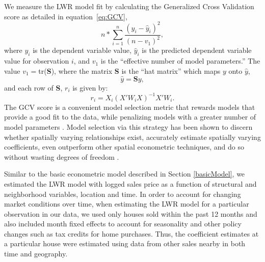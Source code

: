 \documentclass{article}\usepackage[]{graphicx}\usepackage[]{color}
\begin{document}
We measure the LWR model fit by calculating the Generalized Cross Validation score as detailed in equation~\eqref{eq:GCV},
\begin{equation}\label{eq:GCV}
n*\sum_{i=1}^{n}\frac{(y_i-\hat{y}_i)^2}{(n-v_1)^2}, 
\end{equation} 
where $y_i$ is the dependent variable value, $\hat{y}_i$ is the predicted dependent variable value for observation $i$, and $v_1$ is the ``effective number of model parameters.'' The value  
$v_1=$tr(\textbf{S}), where the matrix \textbf{S} is the ``hat matrix'' which maps $y$ onto $\hat{y}$,
                   \begin{equation*}
                   \hat{y}=\textbf{S}y,
                   \end{equation*}
                   and each row of \textbf{S}, $r_i$ is given by:
                     \begin{equation*}
                   r_i=X_i(X'W_iX)^{-1}X'W_i.
                   \end{equation*}
The GCV score is a convenient model selection metric that rewards models that provide a good fit to the data, while penalizing models with a greater number of model parameters \citep{Loader1999, McMillen2010}. Model selection via this strategy has been shown to discern whether spatially varying relationships exist, accurately estimate spatially varying coefficients, even outperform other spatial econometric techniques, and do so without wasting degrees of freedom \citep{Paez2011, McMillen2010, McMillen2012}. 

Similar to the basic econometric model described in Section \ref{basicModel}, we estimated the LWR model with logged sales price as a function of structural and neighborhood variables, location and time. In order to account for changing market conditions over time, when estimating the LWR model for a particular observation in our data, we used only houses sold within the past 12 months and also included month fixed effects to account for seasonality and other policy changes such as tax credits for home purchases. Thus, the coefficient estimates at a particular house were estimated using data from other sales nearby in both time and geography.
\end{document}
